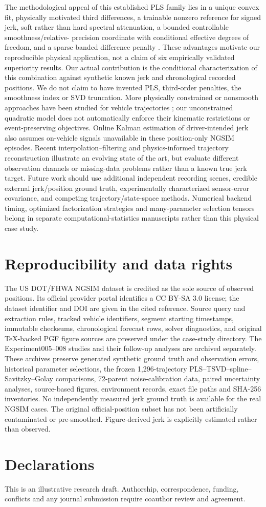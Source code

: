 The methodological appeal of this established
PLS family lies in a unique convex fit,
physically motivated third differences, a
trainable nonzero reference for signed jerk,
soft rather than hard spectral attenuation,
a bounded controllable smoothness/relative-
precision coordinate with conditional
effective degrees of freedom, and a sparse
banded difference penalty
\citep{guerrero2007,guerrero2008,cortes2017,
weinert2007,biessy2026}. These advantages
motivate our reproducible physical application,
not a claim of six empirically validated
superiority results. Our actual contribution
is the conditional characterization of this
combination against synthetic known jerk and
chronological recorded positions. We do not
claim to have invented PLS, third-order
penalties, the smoothness index or SVD
truncation.
More physically constrained or nonsmooth approaches have been
studied for vehicle trajectories \citep{fan2024,zhu2024};
our unconstrained quadratic model does not automatically enforce
their kinematic restrictions or event-preserving objectives.
Online Kalman estimation of driver-intended jerk
\citep{bisoffi2017jerk} also assumes on-vehicle signals
unavailable in these position-only NGSIM episodes.
Recent interpolation--filtering and physics-informed
trajectory reconstruction \citep{ding2026,xie2026}
illustrate an evolving state of the art, but evaluate
different observation channels or missing-data
problems rather than a known true jerk target.
Future work should use additional independent
recording scenes, credible external jerk/position
ground truth, experimentally characterized
sensor-error covariance, and competing
trajectory/state-space methods. Numerical
backend timing, optimized factorization
strategies and many-parameter selection tensors
belong in separate computational-statistics
manuscripts rather than this physical case study.

\section*{Reproducibility and data rights}
The US DOT/FHWA NGSIM dataset \citep{fhwa2016} is credited as the sole source of observed positions. Its official provider portal identifies a CC BY-SA 3.0 license; the dataset identifier and DOI are given in the cited reference. Source query and extraction rules, tracked vehicle identifiers, segment starting timestamps, immutable checksums, chronological forecast rows, solver diagnostics, and original TeX-backed PGF figure sources are preserved under the case-study directory. The Experiment005--008 studies and their follow-up analyses are archived separately. These archives preserve generated synthetic ground truth and observation errors, historical parameter selections, the frozen 1,296-trajectory PLS--TSVD--spline--Savitzky--Golay comparisons, 72-parent noise-calibration data, paired uncertainty analyses, source-based figures, environment records, exact file paths and SHA-256 inventories. No independently measured jerk ground truth is available for the real NGSIM cases. The original official-position subset has not been artificially contaminated or pre-smoothed. Figure-derived jerk is explicitly estimated rather than observed.

\section*{Declarations}
This is an illustrative research draft. Authorship, correspondence, funding, conflicts and any journal submission require coauthor review and agreement.
